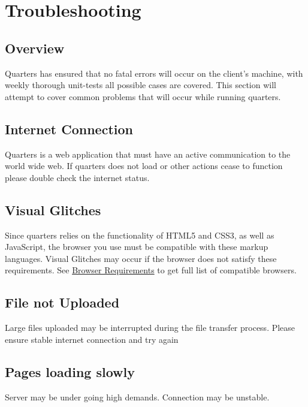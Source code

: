 \documentclass[12pt]{article}
\begin{document}
    \section{Troubleshooting}

    \subsection{Overview}
    Quarters has ensured that no fatal errors will occur on the client's machine, with weekly thorough unit-tests all possible cases are covered. This section will attempt to cover common problems that will occur while running quarters.

    \subsection{Internet Connection}
    Quarters is a web application that must have an active communication to the world wide web. If quarters does not load or other actions cease to function please double check the internet status.

    \subsection{Visual Glitches}
    Since quarters relies on the functionality of HTML5 and CSS3, as well as JavaScript, the browser you use must be compatible with these markup languages. Visual Glitches may occur if the browser does not satisfy these requirements. See \hyperref[sec:browserRequirement]{Browser Requirements} to get full list of compatible browsers.

    \subsection{File not Uploaded}
    Large files uploaded may be interrupted during the file transfer process. Please ensure stable internet connection and try again

    \subsection{Pages loading slowly}
    Server may be under going high demands. Connection may be unstable.

\end{document}
